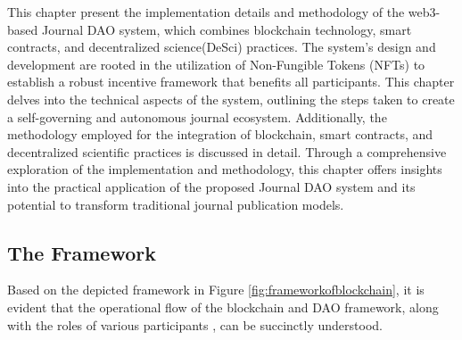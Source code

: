 \documentclass[lettersize,journal]{IEEEtran}
\begin{document}
%  

This chapter present the implementation details and methodology of the web3-based Journal DAO system, which combines blockchain technology, smart contracts, and decentralized science(DeSci) practices. The system's design and development are rooted in the utilization of Non-Fungible Tokens (NFTs) to establish a robust incentive framework that benefits all participants. This chapter delves into the technical aspects of the system, outlining the steps taken to create a self-governing and autonomous journal ecosystem. Additionally, the methodology employed for the integration of blockchain, smart contracts, and decentralized scientific practices is discussed in detail. Through a comprehensive exploration of the implementation and methodology, this chapter offers insights into the practical application of the proposed Journal DAO system and its potential to transform traditional journal publication models.



\subsection{The Framework}



Based on the depicted framework in Figure \ref{fig:frameworkofblockchain}, it is evident that the operational flow of the blockchain and DAO framework, along with the roles of various participants \cite{10459713}, can be succinctly understood. 
\end{document}
